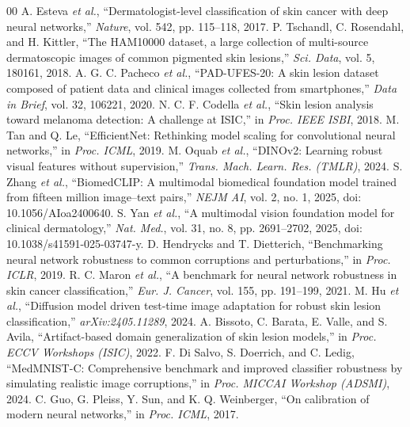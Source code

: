 \documentclass[conference]{IEEEtran}
\begin{document}
\begin{thebibliography}{00}
 A. Esteva \emph{et al.}, ``Dermatologist-level classification of skin cancer with deep neural networks,'' \emph{Nature}, vol. 542, pp. 115--118, 2017.
 P. Tschandl, C. Rosendahl, and H. Kittler, ``The HAM10000 dataset, a large collection of multi-source dermatoscopic images of common pigmented skin lesions,'' \emph{Sci. Data}, vol. 5, 180161, 2018.
 A. G. C. Pacheco \emph{et al.}, ``PAD-UFES-20: A skin lesion dataset composed of patient data and clinical images collected from smartphones,'' \emph{Data in Brief}, vol. 32, 106221, 2020.
 N. C. F. Codella \emph{et al.}, ``Skin lesion analysis toward melanoma detection: A challenge at ISIC,'' in \emph{Proc. IEEE ISBI}, 2018.
 M. Tan and Q. Le, ``EfficientNet: Rethinking model scaling for convolutional neural networks,'' in \emph{Proc. ICML}, 2019.
 M. Oquab \emph{et al.}, ``DINOv2: Learning robust visual features without supervision,'' \emph{Trans. Mach. Learn. Res. (TMLR)}, 2024.
 S. Zhang \emph{et al.}, ``BiomedCLIP: A multimodal biomedical foundation model trained from fifteen million image--text pairs,'' \emph{NEJM AI}, vol. 2, no. 1, 2025, doi: 10.1056/AIoa2400640.
 S. Yan \emph{et al.}, ``A multimodal vision foundation model for clinical dermatology,'' \emph{Nat. Med.}, vol. 31, no. 8, pp. 2691--2702, 2025, doi: 10.1038/s41591-025-03747-y.
 D. Hendrycks and T. Dietterich, ``Benchmarking neural network robustness to common corruptions and perturbations,'' in \emph{Proc. ICLR}, 2019.
 R. C. Maron \emph{et al.}, ``A benchmark for neural network robustness in skin cancer classification,'' \emph{Eur. J. Cancer}, vol. 155, pp. 191--199, 2021.
 M. Hu \emph{et al.}, ``Diffusion model driven test-time image adaptation for robust skin lesion classification,'' \emph{arXiv:2405.11289}, 2024.
 A. Bissoto, C. Barata, E. Valle, and S. Avila, ``Artifact-based domain generalization of skin lesion models,'' in \emph{Proc. ECCV Workshops (ISIC)}, 2022.
 F. Di Salvo, S. Doerrich, and C. Ledig, ``MedMNIST-C: Comprehensive benchmark and improved classifier robustness by simulating realistic image corruptions,'' in \emph{Proc. MICCAI Workshop (ADSMI)}, 2024.
 C. Guo, G. Pleiss, Y. Sun, and K. Q. Weinberger, ``On calibration of modern neural networks,'' in \emph{Proc. ICML}, 2017.

\end{thebibliography}
\end{document}
